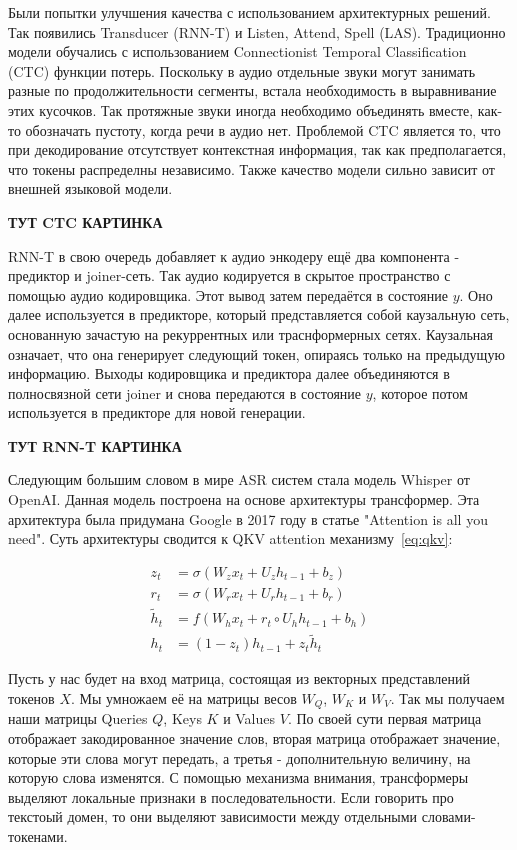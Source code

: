 Были попытки улучшения качества с использованием архитектурных решений.
Так появились Transducer (RNN-T) и Listen, Attend, Spell (LAS).
Традиционно модели обучались с использованием Connectionist Temporal Classification (CTC) функции потерь.
Поскольку в аудио отдельные звуки могут занимать разные по продолжительности сегменты, встала необходимость в выравнивание этих кусочков.
Так протяжные звуки иногда необходимо объединять вместе, как-то обозначать пустоту, когда речи в аудио нет.
Проблемой CTC является то, что при декодирование отсутствует контекстная информация, так как предполагается, что токены распределны независимо.
Также качество модели сильно зависит от внешней языковой модели.

\textbf{ТУТ CTC КАРТИНКА}

RNN-T в свою очередь добавляет к аудио энкодеру ещё два компонента - предиктор и joiner-сеть.
Так аудио кодируется в скрытое пространство с помощью аудио кодировщика.
Этот вывод затем передаётся в состояние $y$.
Оно далее используется в предикторе, который представляется собой каузальную сеть, основанную зачастую на рекуррентных или траснформерных сетях.
Каузальная означает, что она генерирует следующий токен, опираясь только на предыдущую информацию.
Выходы кодировщика и предиктора далее объединяются в полносвязной сети joiner и снова передаются в состояние $y$, которое потом используется в предикторе для новой генерации.

\textbf{ТУТ RNN-T КАРТИНКА}

Следующим большим словом в мире ASR систем стала модель Whisper от OpenAI.
Данная модель построена на основе архитектуры трансформер.
Эта архитектура была придумана Google в 2017 году в статье "Attention is all you need".
Суть архитектуры сводится к QKV attention механизму~\ref{eq:qkv}:

\begin{equation}
  \begin{aligned}
    z_t &= \sigma(W_z x_t + U_z h_{t-1} + b_z) \\
    r_t &= \sigma(W_r x_t + U_r h_{t-1} + b_r) \\
    \tilde{h}_t &= f(W_h x_t + r_t \circ U_h h_{t-1} + b_h) \\
    h_t &= (1 - z_t) h_{t-1} + z_t \tilde{h}_t
  \end{aligned}
  \label{eq:qkv}
\end{equation}

Пусть у нас будет на вход матрица, состоящая из векторных представлений токенов $X$.
Мы умножаем её на матрицы весов $W_Q$, $W_K$ и $W_V$.
Так мы получаем наши матрицы Queries $Q$, Keys $K$ и Values $V$.
По своей сути первая матрица отображает закодированное значение слов, вторая матрица отображает значение, которые эти слова могут передать, а третья - дополнительную величину, на которую слова изменятся.
С помощью механизма внимания, трансформеры выделяют локальные признаки в последовательности.
Если говорить про текстоый домен, то они выделяют зависимости между отдельными словами-токенами.

